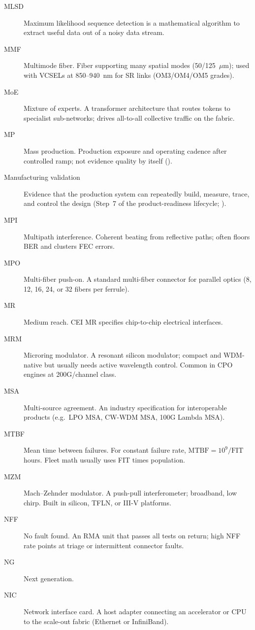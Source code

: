 \begin{description}
\item[MLSD] Maximum likelihood sequence detection is a mathematical algorithm to extract useful data out of a noisy data stream.
\item[MMF] Multimode fiber. Fiber supporting many spatial modes (50/125~$\mu$m); used with VCSELs at 850--940~nm for SR links (OM3/OM4/OM5 grades).
\item[MoE] Mixture of experts. A transformer architecture that routes tokens to specialist sub-networks; drives all-to-all collective traffic on the fabric.
\item[MP] Mass production. Production exposure and operating cadence after controlled ramp; not evidence quality by itself ().
\item[Manufacturing validation] Evidence that the production system can repeatedly build, measure, trace, and control the design (Step~7 of the product-readiness lifecycle; ).
\item[MPI] Multipath interference. Coherent beating from reflective paths; often floors BER and clusters FEC errors.
\item[MPO] Multi-fiber push-on. A standard multi-fiber connector for parallel optics (8, 12, 16, 24, or 32 fibers per ferrule).
\item[MR] Medium reach. CEI MR specifies chip-to-chip electrical interfaces.
\item[MRM] Microring modulator. A resonant silicon modulator; compact and WDM-native but usually needs active wavelength control. Common in CPO engines at 200G/channel class.
\item[MSA] Multi-source agreement. An industry specification for interoperable products (e.g.\ LPO MSA, CW-WDM MSA, 100G Lambda MSA).
\item[MTBF] Mean time between failures. For constant failure rate, $\mathrm{MTBF}=10^9/\mathrm{FIT}$ hours. Fleet math usually uses FIT times population.
\item[MZM] Mach--Zehnder modulator. A push-pull interferometer; broadband, low chirp. Built in silicon, TFLN, or III-V platforms.
\item[NFF] No fault found. An RMA unit that passes all tests on return; high NFF rate points at triage or intermittent connector faults.
\item[NG] Next generation.
\item[NIC] Network interface card. A host adapter connecting an accelerator or CPU to the scale-out fabric (Ethernet or InfiniBand).

\end{description}
